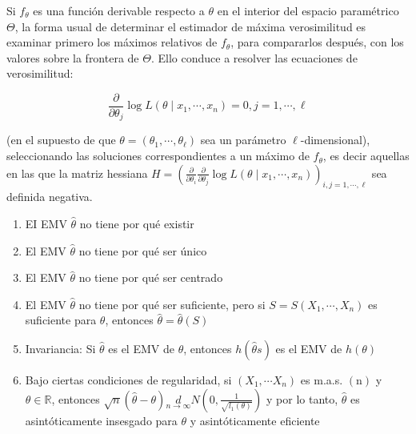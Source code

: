 Si $f_{\theta}$ es una función derivable respecto a $\theta$ en el interior del
espacio paramétrico $\Theta$, la forma usual de determinar el estimador de
máxima verosimilitud es examinar primero los máximos relativos de $f_{\theta}$,
para compararlos después, con los valores sobre la frontera de $\Theta$. Ello
conduce a resolver las ecuaciones de verosimilitud:

$$
  \frac{\partial}{\partial \theta_{j}} \log L\left(\theta \mid x_{1}, \cdots, x_{n}\right)=0, j=1, \cdots, \ell
$$

(en el supuesto de que $\theta=\left(\theta_{1}, \cdots, \theta_{\ell}\right)$ sea un parámetro $\ell$-dimensional), seleccionando las soluciones correspondientes a un máximo de $f_{\theta}$, es decir aquellas en las que la matriz hessiana $H=\left(\frac{\partial}{\partial \theta_{i}} \frac{\partial}{\partial \theta_{j}} \log L\left(\theta \mid x_{1}, \cdots, x_{n}\right)\right)_{i, j=1, \cdots, \ell}$ sea definida negativa.\\

\begin{observación}
\vspace{-\topsep} %
\vspace{-\topsep} %
\vspace{-\topsep} %
\begin{enumerate}
  \item  EI EMV $\hat{\theta}$ no tiene por qué existir
  \item El EMV $\hat{\theta}$ no tiene por qué ser único
  \item El EMV $\hat{\theta}$ no tiene por qué ser centrado
  \item El EMV $\hat{\theta}$ no tiene por qué ser suficiente, pero si $S=S\left(X_{1},
          \cdots, X_{n}\right)$ es suficiente para $\theta$, entonces
        $\hat{\theta}=\hat{\theta}(S)$
  \item Invariancia: Si $\hat{\theta}$ es el EMV de $\theta$, entonces
        $h(\hat{\theta}s)$ es el EMV de $h(\theta)$
  \item Bajo ciertas condiciones de regularidad, si $\left(X_{1}, \cdots X_{n}\right)$
        es m.a.s. $(\mathrm{n})$ y $\theta \in \mathbb{R}$, entonces
        $\sqrt{n}(\hat{\theta}-\theta) \underset{n \rightarrow \infty}{d} N\left(0,
          \frac{1}{\sqrt{l_{1}(\theta)}}\right)$ y por lo tanto, $\hat{\theta}$ es
        asintóticamente insesgado para $\theta$ y asintóticamente eficiente
\end{enumerate}
\end{observación}

